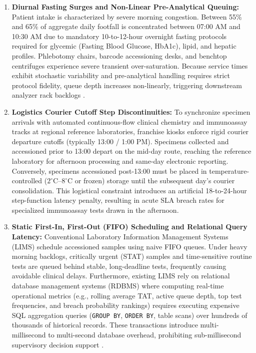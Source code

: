 \documentclass[conference]{IEEEtran}
\begin{document}
\begin{enumerate}
    \item \textbf{Diurnal Fasting Surges and Non-Linear Pre-Analytical Queuing:} Patient intake is characterized by severe morning congestion. Between 55\% and 65\% of aggregate daily footfall is concentrated between 07:00 AM and 10:30 AM due to mandatory 10-to-12-hour overnight fasting protocols required for glycemic (Fasting Blood Glucose, HbA1c), lipid, and hepatic profiles. Phlebotomy chairs, barcode accessioning desks, and benchtop centrifuges experience severe transient over-saturation. Because service times exhibit stochastic variability and pre-analytical handling requires strict protocol fidelity, queue depth increases non-linearly, triggering downstream analyzer rack backlogs \cite{armony2015patient,green2006queueing}.
    \item \textbf{Logistics Courier Cutoff Step Discontinuities:} To synchronize specimen arrivals with automated continuous-flow clinical chemistry and immunoassay tracks at regional reference laboratories, franchise kiosks enforce rigid courier departure cutoffs (typically 13:00 / 1:00 PM). Specimens collected and accessioned prior to 13:00 depart on the mid-day route, reaching the reference laboratory for afternoon processing and same-day electronic reporting. Conversely, specimens accessioned post-13:00 must be placed in temperature-controlled ($2^\circ\text{C}$--$8^\circ\text{C}$ or frozen) storage until the subsequent day's courier consolidation. This logistical constraint introduces an artificial 18-to-24-hour step-function latency penalty, resulting in acute SLA breach rates for specialized immunoassay tests drawn in the afternoon.
    \item \textbf{Static First-In, First-Out (FIFO) Scheduling and Relational Query Latency:} Conventional Laboratory Information Management Systems (LIMS) schedule accessioned samples using naive FIFO queues. Under heavy morning backlogs, critically urgent (STAT) samples and time-sensitive routine tests are queued behind stable, long-deadline tests, frequently causing avoidable clinical delays. Furthermore, existing LIMS rely on relational database management systems (RDBMS) where computing real-time operational metrics (e.g., rolling average TAT, active queue depth, top test frequencies, and breach probability rankings) requires executing expensive SQL aggregation queries (\texttt{GROUP BY}, \texttt{ORDER BY}, table scans) over hundreds of thousands of historical records. These transactions introduce multi-millisecond to multi-second database overhead, prohibiting sub-millisecond supervisory decision support \cite{hansen2021improving}.
\end{enumerate}
\end{document}
